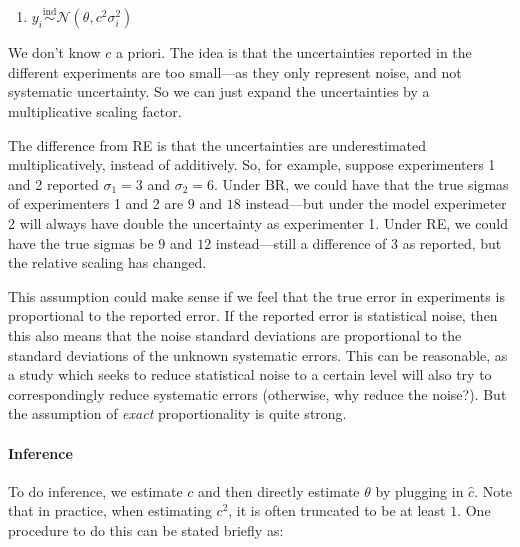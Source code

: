\documentclass[12pt]{article}
\begin{document}
\begin{enumerate}
\item
  $y_i\overset{\mathrm{ind}}{\sim}\mathcal{N}(\theta,c^2\sigma_i^2)$
\end{enumerate}

We don't know $c$ a priori. The idea is that the uncertainties reported in the different experiments are too small---as they only represent noise, and not systematic uncertainty. So we can just expand the uncertainties by a multiplicative scaling factor.

The difference from RE is that the uncertainties are underestimated multiplicatively, instead of additively. So, for example, suppose experimenters 1 and 2 reported $\sigma_1=3$ and $\sigma_2=6$. Under BR, we could have that the true sigmas of experimenters 1 and 2 are $9$ and $18$ instead---but under the model experimeter 2 will always have double the uncertainty as experimenter 1. Under RE, we could have the true sigmas be $9$ and $12$ instead---still a difference of 3 as reported, but the relative scaling has changed.

This assumption could make sense if we feel that the true error in experiments is proportional to the reported error. If the reported error is statistical noise, then this also means that the noise standard deviations are proportional to the standard deviations of the unknown systematic errors. This can be reasonable, as a study which seeks to reduce statistical noise to a certain level will also try to correspondingly reduce systematic errors (otherwise, why reduce the noise?). But the assumption of \emph{exact} proportionality is quite strong.

\paragraph{Inference}\label{inference-2}

To do inference, we estimate $c$ and then directly estimate $\theta$ by plugging in $\hat c$. Note that in practice, when estimating $c^2$, it is often truncated to be at least $1$. One procedure to do this can be stated briefly as:
\end{document}
